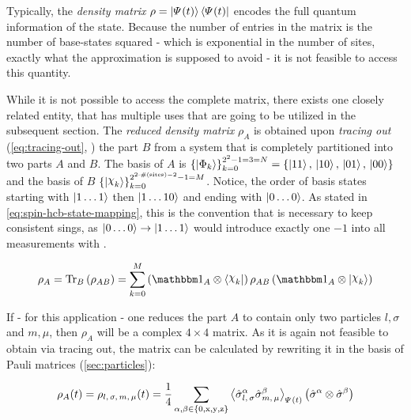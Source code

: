Typically, the \emph{density matrix} $\rho = \ketpsiof[]{t}\brapsiof[]{t}$ encodes the full quantum information of the state. 
Because the number of entries in the matrix is the number of base-states squared - which is exponential in the number of sites, exactly what the approximation is supposed to avoid - it is not feasible to access this quantity.

While it is not possible to access the complete matrix, there exists one closely related entity, that has multiple uses that are going to be utilized in the subsequent section.
The \emph{reduced density matrix} $\rho_A$ is obtained upon \emph{tracing out} (\autoref{eq:tracing-out}, \cite{partialTraceEntanglementOfSubsystemsBlochVector}) the part $B$ from a system that is completely partitioned into two parts $A$ and $B$.
The basis of $A$ is $\left\{\ketN[\Phi_k]\right\}_{k=0}^{2^{2}-1 = 3 = N} = \left\{\ketN[11],\,\ketN[10],\,\ketN[01],\,\ketN[00]\right\}$ and the basis of $B$ $\left\{\ketN[\Chi_k]\right\}_{k=0}^{2^{2 \cdot \#\left(\text{sites}\right) - 2}-1 = M}$.
Notice, the order of basis states starting with $\ketN[1\dots1]$ then $\ketN[1\dots10]$ and ending with $\ketN[0\dots0]$. As stated in \autoref{eq:spin-hcb-state-mapping}, this is the convention that is necessary to keep consistent sings, as $\ketN[0\dots0] \rightarrow \ketN[1\dots1]$ would introduce exactly one $-1$ into all measurements with .

\begin{equation}
    \label{eq:tracing-out}
    \rho_A = \partialTrace{B}{\rho_{AB}} = \sum\limits_{k=0}^{M} \left(\one[A]\otimes\braN[\Chi_k] \right)\rho_{AB}\left(\one[A]\otimes\ketN[\Chi_k]\right)
\end{equation}

If - for this application - one reduces the part $A$ to contain only two particles $l, \sigma$ and $m, \mu$, then $\rho_A$ will be a complex $4\times 4$ matrix.
As it is again not feasible to obtain via tracing out, the matrix can be calculated by rewriting it in the basis of Pauli matrices (\ref{sec:particles}):

\begin{equation}
    \label{eq:reduced-density-matrix-via-paulis}
    \rho_A (t) = \rho_{l,\,\sigma,\,m,\,\mu} (t) = \frac{1}{4} \sum\limits_{\alpha,\beta\in\left\{0,\text{x},\text{y},\text{z}\right\}}
    {\left\langle \pauli[l,\,\sigma]{$\alpha$}\pauli[m,\,\mu]{$\beta$} \right\rangle}_{\psiOfT} \left(\pauli[]{$\alpha$}\otimes\pauli[]{$\beta$}\right)
\end{equation}

